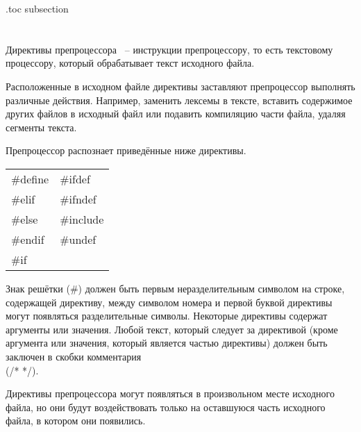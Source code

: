 \renewcommand{\lstlistingname}{Пример} 

\etocsettocdepth.toc {subsection}

\chapter{}
\label{sec:Preprocessor}

Директивы препроцессора ~-- инструкции препроцессору, то есть текстовому процессору, который обрабатывает текст исходного файла. 

Расположенные в исходном файле директивы заставляют препроцессор выполнять различные действия. Например, заменить лексемы в тексте, вставить содержимое других файлов в исходный файл или подавить компиляцию части файла, удаляя сегменты текста. 

Препроцессор распознает приведённые ниже директивы.

\renewcommand{\arraystretch}{1.2} %
\renewcommand{\tabcolsep}{1.0cm}   %
\begin{center}
\begin{tabular}{ l l }
\#define & \#ifdef \\
\#elif & \#ifndef  \\
\#else & \#include \\
\#endif & \#undef \\
\#if &  \\
\end{tabular}
\end{center}
Знак решётки (\#) должен быть первым неразделительным символом на строке, содержащей директиву, между символом номера и первой буквой директивы могут появляться разделительные символы. Некоторые директивы содержат аргументы или значения. Любой текст, который следует за директивой (кроме аргумента или значения, который является частью директивы) должен быть заключен в скобки комментария \\ (/*  */). \killoverfullbefore

Директивы препроцессора могут появляться в произвольном месте исходного файла, но они будут воздействовать только на оставшуюся часть исходного файла, в котором они появились. \killoverfullbefore

\section{}

